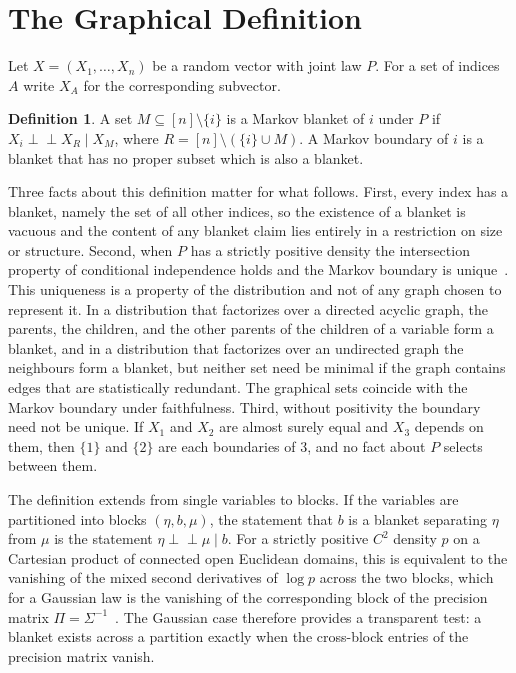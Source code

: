 \documentclass[11pt]{article}
\theoremstyle{definition}
\newtheorem{definition}{Definition}
\newcommand{\Ind}{\perp\!\!\!\perp}
\begin{document}
\section{The Graphical Definition}

Let $X=(X_1,\dots,X_n)$ be a random vector with joint law $P$. For a set of indices $A$ write $X_A$ for the corresponding subvector.

\begin{definition}
A set $M\subseteq[n]\setminus\{i\}$ is a Markov blanket of $i$ under $P$ if $X_i \Ind X_R \mid X_M$, where $R=[n]\setminus(\{i\}\cup M)$. A Markov boundary of $i$ is a blanket that has no proper subset which is also a blanket.
\end{definition}

Three facts about this definition matter for what follows. First, every index has a blanket, namely the set of all other indices, so the existence of a blanket is vacuous and the content of any blanket claim lies entirely in a restriction on size or structure. Second, when $P$ has a strictly positive density the intersection property of conditional independence holds and the Markov boundary is unique~\cite{dawid1979,lauritzen1996}. This uniqueness is a property of the distribution and not of any graph chosen to represent it. In a distribution that factorizes over a directed acyclic graph, the parents, the children, and the other parents of the children of a variable form a blanket, and in a distribution that factorizes over an undirected graph the neighbours form a blanket, but neither set need be minimal if the graph contains edges that are statistically redundant. The graphical sets coincide with the Markov boundary under faithfulness. Third, without positivity the boundary need not be unique. If $X_1$ and $X_2$ are almost surely equal and $X_3$ depends on them, then $\{1\}$ and $\{2\}$ are each boundaries of $3$, and no fact about $P$ selects between them.

The definition extends from single variables to blocks. If the variables are partitioned into blocks $(\eta,b,\mu)$, the statement that $b$ is a blanket separating $\eta$ from $\mu$ is the statement $\eta\Ind\mu\mid b$. For a strictly positive $C^2$ density $p$ on a Cartesian product of connected open Euclidean domains, this is equivalent to the vanishing of the mixed second derivatives of $\log p$ across the two blocks, which for a Gaussian law is the vanishing of the corresponding block of the precision matrix $\Pi=\Sigma^{-1}$~\cite{lauritzen1996}. The Gaussian case therefore provides a transparent test: a blanket exists across a partition exactly when the cross-block entries of the precision matrix vanish.
\end{document}
